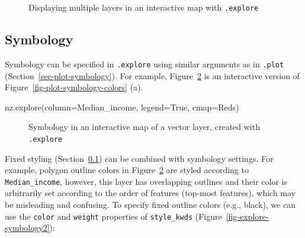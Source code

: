 \documentclass[
  letterpaper,
]{krantz}
\newenvironment{Shaded}{\begin{snugshade}}{\end{snugshade}}
\newcommand{\NormalTok}[1]{\textcolor[rgb]{0.00,0.23,0.31}{#1}}
\newcommand{\OperatorTok}[1]{\textcolor[rgb]{0.37,0.37,0.37}{#1}}
\newcommand{\StringTok}[1]{\textcolor[rgb]{0.13,0.47,0.30}{#1}}
\newcommand{\VariableTok}[1]{\textcolor[rgb]{0.07,0.07,0.07}{#1}}
\begin{document}
\begin{figure}


\caption{\label{fig-explore-layers-controls}Displaying multiple layers
in an interactive map with \texttt{.explore}}

\end{figure}%

\subsection{Symbology}\label{sec-explore-symbology}

Symbology can be specified in \texttt{.explore} using similar arguments
as in \texttt{.plot} (Section~\ref{sec-plot-symbology}). For example,
Figure~\ref{fig-explore-symbology} is an interactive version of
Figure~\ref{fig-plot-symbology-colors} (a).

\begin{Shaded}
\begin{Highlighting}[]
\NormalTok{nz.explore(column}\OperatorTok{=}\StringTok{\textquotesingle{}Median\_income\textquotesingle{}}\NormalTok{, legend}\OperatorTok{=}\VariableTok{True}\NormalTok{, cmap}\OperatorTok{=}\StringTok{\textquotesingle{}Reds\textquotesingle{}}\NormalTok{)}
\end{Highlighting}
\end{Shaded}

\begin{figure}


\caption{\label{fig-explore-symbology}Symbology in an interactive map of
a vector layer, created with \texttt{.explore}}

\end{figure}%

Fixed styling (Section~\ref{sec-explore-symbology}) can be combined with
symbology settings. For example, polygon outline colors in
Figure~\ref{fig-explore-symbology} are styled according to
\texttt{\textquotesingle{}Median\_income\textquotesingle{}}, however,
this layer has overlapping outlines and their color is arbitrarily set
according to the order of features (top-most features), which may be
misleading and confusing. To specify fixed outline colors (e.g., black),
we can use the \texttt{color} and \texttt{weight} properties of
\texttt{style\_kwds} (Figure~\ref{fig-explore-symbology2}):
\end{document}
